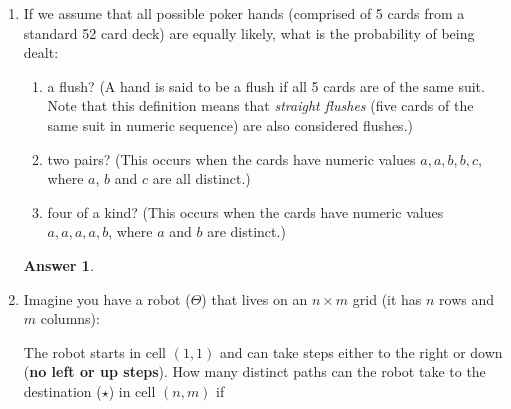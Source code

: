 \documentclass[12pt]{article}
\renewcommand{\(}{\left(}
\renewcommand{\)}{\right)}
\theoremstyle{definition}
\newtheorem*{answer}{Answer}
\begin{document}
\begin{enumerate}
\item If we assume that all possible poker hands (comprised of 5 cards from a standard 52 card deck) are equally likely, what is the probability of being dealt:
    \begin{enumerate}[label=\alph*.]

    \item a flush?  (A hand is said to be a flush if all 5 cards are of the same suit.  Note that this definition means that \emph{straight flushes} (five cards of the same suit in numeric sequence) are also considered flushes.)
    \item two pairs?  (This occurs when the cards have numeric values $a, a, b, b, c$, where $a$, $b$ and $c$ are all distinct.)
    \item four of a kind?  (This occurs when the cards have numeric values $a, a, a, a, b$, where $a$ and $b$ are distinct.)

    \end{enumerate}

    \begin{shaded}
    \begin{answer}

    \end{answer}
    \end{shaded}
    \newpage


\item Imagine you have a robot ($\Theta$) that lives on an $n \times m$ grid (it has $n$ rows and $m$ columns):
%
\begin{center}
\end{center}
%
The robot starts in cell $(1, 1)$ and can take steps either to the right or down (\textbf{no left or up
steps}). How many distinct paths can the robot take to the destination ($\star$) in cell $(n, m)$ if
    \begin{enumerate}[label=\alph*.]


\end{enumerate}
\end{enumerate}
\end{document}
